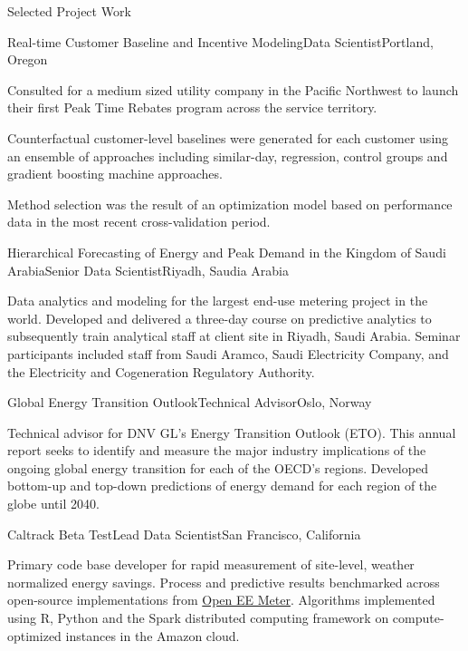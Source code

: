 \documentclass{resume} %
\begin{document}
\begin{rSection}{Selected Project Work}
\begin{rSubsection}{Real-time Customer Baseline and Incentive Modeling}{}{Data Scientist}{Portland, Oregon}
\item[] Consulted for a medium sized utility company in the Pacific Northwest to launch their first 
Peak Time Rebates program across the service territory.
\item[] Counterfactual customer-level baselines were generated for each customer using an ensemble of approaches including similar-day, regression, control groups and gradient boosting machine approaches.
\item[] Method selection was the result of an optimization model based on performance data in the most recent cross-validation period. 
\end{rSubsection}

\begin{rSubsection}{Hierarchical Forecasting of Energy and Peak Demand in the Kingdom of Saudi Arabia}{}{Senior Data Scientist}{Riyadh, Saudia Arabia}
\item[] Data analytics and modeling for the largest end-use metering project in the world. Developed and delivered a three-day course on predictive analytics to subsequently train analytical staff at client site in Riyadh, Saudi Arabia. Seminar participants included staff from Saudi Aramco, Saudi Electricity Company, and the Electricity and Cogeneration Regulatory Authority. 

\end{rSubsection}

\pagebreak

\begin{rSubsection}{Global Energy Transition Outlook}{}{Technical Advisor}{Oslo, Norway}
\item[] Technical advisor for DNV GL's Energy Transition Outlook (ETO). This annual report seeks to identify and measure the major industry implications of the ongoing global energy transition for each of the OECD's regions. Developed bottom-up and top-down predictions of energy demand for each region of the globe until 2040. 
\end{rSubsection}

\begin{rSubsection}{Caltrack Beta Test}{}{Lead Data Scientist}{San Francisco, California}
\item[] Primary code base developer for rapid measurement of site-level, weather normalized energy savings. Process and predictive results benchmarked across open-source implementations from \href{https://github.com/impactlab/caltrack}{Open EE Meter}. Algorithms implemented using R, Python and the Spark distributed computing framework on compute-optimized instances in the Amazon cloud.
\end{rSubsection}


\end{rSection}
\end{document}
